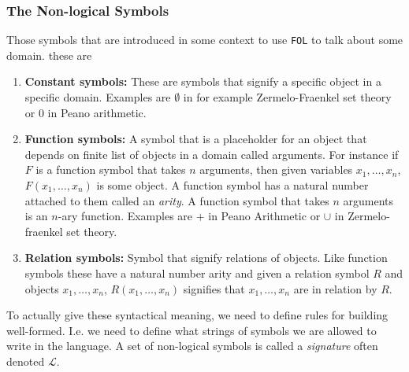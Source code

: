 \subsubsection{The Non-logical Symbols}
Those symbols that are introduced in some context to use \verb|FOL| to talk about some domain. these are 
\begin{enumerate}
    \item \textbf{Constant symbols:} These are symbols that signify a specific object in a specific domain. Examples are $\emptyset$ in for example Zermelo-Fraenkel set theory or $0$ in Peano arithmetic.
    \item \textbf{Function symbols:} A symbol that is a placeholder for an object that depends on finite list of objects in a domain called arguments. For instance if $F$ is a function symbol that takes $n$ arguments, then given variables $x_1,\dots, x_n$, $F(x_1,\dots,x_n)$ is some object. A function symbol has a natural number attached to them called an \emph{arity}. A function symbol that takes $n$ arguments is an $n$-ary function. Examples are $+$ in Peano Arithmetic or $\cup$ in Zermelo-fraenkel set theory. 
    \item \textbf{Relation symbols:} Symbol that signify relations of objects. Like function symbols these have a natural number arity and given a relation symbol $R$ and objects $x_1,\dots, x_n$, $R(x_1,\dots,x_n)$ signifies that $x_1,\dots,x_n$ are in relation by $R$.  
\end{enumerate}
To actually give these syntactical meaning, we need to define rules for building well-formed. I.e. we need to define what strings of symbols we are allowed to write in the language. A set of non-logical symbols is called a \textit{signature} often denoted $\mathcal{L}$. 
